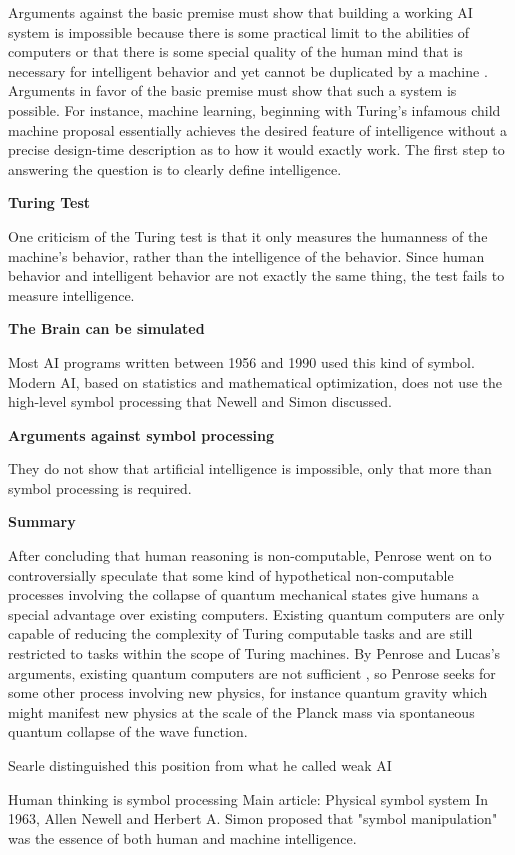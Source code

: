\documentclass{article}
\begin{document}
Arguments against the basic premise must show that building a working AI system is impossible because there is some practical limit to the abilities of computers or that there is some special quality of the human mind that is necessary for intelligent behavior and yet cannot be duplicated by a machine . Arguments in favor of the basic premise must show that such a system is possible. For instance, machine learning, beginning with Turing's infamous child machine proposal essentially achieves the desired feature of intelligence without a precise design-time description as to how it would exactly work. The first step to answering the question is to clearly define intelligence.

\textbf{Turing Test}


One criticism of the Turing test is that it only measures the humanness of the machine's behavior, rather than the intelligence of the behavior. Since human behavior and intelligent behavior are not exactly the same thing, the test fails to measure intelligence.

\textbf{The Brain can be simulated}

Most AI programs written between 1956 and 1990 used this kind of symbol. Modern AI, based on statistics and mathematical optimization, does not use the high-level symbol processing that Newell and Simon discussed.

\textbf{Arguments against symbol processing}

They do not show that artificial intelligence is impossible, only that more than symbol processing is required.

\textbf{Summary}

After concluding that human reasoning is non-computable, Penrose went on to controversially speculate that some kind of hypothetical non-computable processes involving the collapse of quantum mechanical states give humans a special advantage over existing computers. Existing quantum computers are only capable of reducing the complexity of Turing computable tasks and are still restricted to tasks within the scope of Turing machines. By Penrose and Lucas's arguments, existing quantum computers are not sufficient , so Penrose seeks for some other process involving new physics, for instance quantum gravity which might manifest new physics at the scale of the Planck mass via spontaneous quantum collapse of the wave function.

Searle distinguished this position from what he called weak AI

Human thinking is symbol processing Main article: Physical symbol system In 1963, Allen Newell and Herbert A. Simon proposed that "symbol manipulation" was the essence of both human and machine intelligence.
\end{document}
